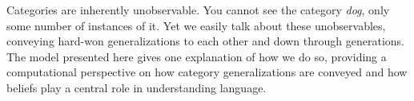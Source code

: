 \documentclass[10pt,letterpaper]{article}
\begin{document}
Categories are inherently unobservable. 
You cannot see the category \emph{dog}, only some number of instances of it.
Yet we easily talk about these unobservables, conveying hard-won generalizations to each other and down through generations.
The model presented here gives one explanation of how we do so, providing a computational perspective on how category generalizations are conveyed and how beliefs play a central role in understanding language.



%




\setlength{\bibleftmargin}{.125in}
\setlength{\bibindent}{-\bibleftmargin}


\end{document}
